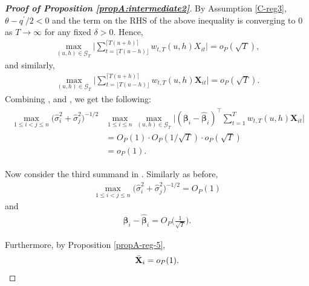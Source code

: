 \documentclass[a4paper,12pt]{article}
\makeatletter
\renewcommand{\eqref}[1]{\tagform@{\ref{#1}}}
\makeatother
\begin{document}
\begin{proof}[\textnormal{\textbf{Proof of Proposition \ref{propA:intermediate2}}}]
By Assumption \ref{C-reg3}, $\theta - q^\prime/2 <0$ and the term on the RHS of the above inequality is converging to $0$ as $T \to \infty$ for any fixed $\delta >0$. Hence, 
\begin{align*}
\max_{(u, h) \in \mathcal{G}_T} \bigg| \sum_{t=\lfloor T(u-h) \rfloor}^{\lceil T(u+h) \rceil} w_{t,T}(u,h)X_{it}  \bigg| = o_P(\sqrt{T}),
\end{align*}
and similarly,
\begin{align}\label{ineq-diff-9}
\max_{(u, h) \in \mathcal{G}_T} \bigg| \sum_{t=\lfloor T(u-h) \rfloor}^{\lceil T(u+h) \rceil} w_{t,T}(u,h)\mathbf{X}_{it}  \bigg| = o_P(\sqrt{T}).
\end{align}
Combining \eqref{ineq-diff-6}, \eqref{ineq-diff-7} and \eqref{ineq-diff-9}, we get the following:
\begin{align}\label{ineq-diff-10}
\begin{split}
\max_{1\le i < j \le n} \big(\widehat{\sigma}_i^2+ \widehat{\sigma}_j^2 \big)^{-1/2}&\max_{1\le i \le n} \max_{(u,h) \in \mathcal{G}_T} \Big| (\bm{\beta}_i - \widehat{\bm{\beta}}_i)^\top\sum_{t=1}^T w_{t,T}(u,h) \mathbf{X}_{it} \Big|  \\
&=O_P(1) \cdot O_P(1/\sqrt{T}) \cdot o_P(\sqrt{T}) \\
&= o_P(1).
\end{split}
\end{align}


Now consider the third summand in \eqref{ineq-diff-1}. Similarly as before, 
\begin{align}\label{ineq-diff-11}
\max_{1\le i < j \le n}\big(\widehat{\sigma}_i^2+ \widehat{\sigma}_j^2 \big)^{-1/2}  = O_P(1)
\end{align}
and
\begin{align}\label{ineq-diff-12}
\bm{\beta}_i - \widehat{\bm{\beta}}_i = O_P\Big(\frac{1}{\sqrt{T}}\Big).
\end{align}

Furthermore, by Proposition \ref{propA-reg-5}, 
\begin{align}\label{eq:proof12}
\bar{\mathbf{X}}_i = o_P(1).
\end{align}


\end{proof}
\end{document}
